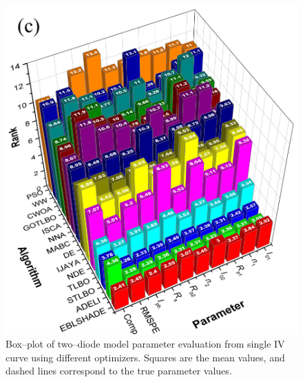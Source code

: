 \documentclass[a4paper,fleqn]{cas-dc}
\begin{document}
\begin{figure}[]
        \includegraphics[width=.8\columnwidth]{QuadeRank}
	  \caption{Box--plot of  two--diode model parameter evaluation from single IV curve using different optimizers.
      Squares are the mean values, and dashed lines correspond to the true parameter values.}\label{figRanksSingleIV}
\end{figure}



\end{document}
